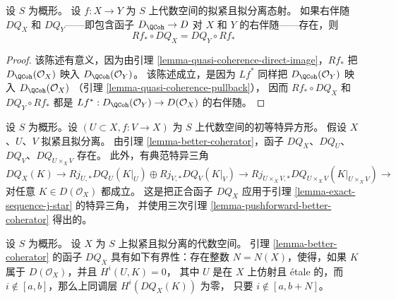 \begin{lemma}
\label{lemma-pushforward-better-coherator}
设 $S$ 为概形。
设 $f : X \to Y$ 为 $S$ 上代数空间的拟紧且拟分离态射。
如果右伴随 $DQ_X$ 和 $DQ_Y$——即包含函子
$D_\QCoh \to D$ 对 $X$ 和 $Y$ 的右伴随——存在，则
$$
Rf_* \circ DQ_X = DQ_Y \circ Rf_*
$$
\end{lemma}

\begin{proof}
该陈述有意义，因为由引理
\ref{lemma-quasi-coherence-direct-image}，$Rf_*$
把 $D_\QCoh(\mathcal{O}_X)$ 映入 $D_\QCoh(\mathcal{O}_Y)$。
该陈述成立，是因为 $Lf^*$ 同样把
$D_\QCoh(\mathcal{O}_Y)$ 映入 $D_\QCoh(\mathcal{O}_X)$
（引理 \ref{lemma-quasi-coherence-pullback}），
因而 $Rf_* \circ DQ_X$ 和 $DQ_Y \circ Rf_*$
都是 $Lf^* : D_\QCoh(\mathcal{O}_Y) \to D(\mathcal{O}_X)$ 的右伴随。
\end{proof}

\begin{remark}
\label{remark-explain-consequence}
设 $S$ 为概形。设 $(U \subset X, f : V \to X)$ 为
$S$ 上代数空间的初等特异方形。
假设 $X$、$U$、$V$ 拟紧且拟分离。
由引理 \ref{lemma-better-coherator}，函子
$DQ_X$、$DQ_U$、$DQ_V$、$DQ_{U \times_X V}$ 存在。
此外，有典范特异三角
$$
DQ_X(K) \to Rj_{U, *}DQ_U(K|_U) \oplus Rj_{V, *}DQ_V(K|_V)
\to Rj_{U \times_X V, *}DQ_{U \times_X V}(K|_{U \times_X V}) \to
$$
对任意 $K \in D(\mathcal{O}_X)$ 都成立。
这是把正合函子 $DQ_X$ 应用于引理
\ref{lemma-exact-sequence-j-star} 的特异三角，
并使用三次引理 \ref{lemma-pushforward-better-coherator} 得出的。
\end{remark}

\begin{lemma}
\label{lemma-boundedness-better-coherator}
设 $S$ 为概形。
设 $X$ 为 $S$ 上拟紧且拟分离的代数空间。
引理 \ref{lemma-better-coherator} 的函子 $DQ_X$
具有如下有界性：存在整数 $N = N(X)$，使得，如果
$K$ 属于 $D(\mathcal{O}_X)$，并且 $H^i(U, K) = 0$，
其中 $U$ 是在 $X$ 上仿射且 \'etale 的，而
$i \not \in [a, b]$，那么上同调层 $H^i(DQ_X(K))$ 为零，
只要 $i \not \in [a, b + N]$。
\end{lemma}

